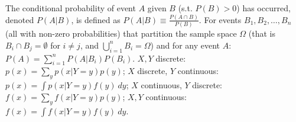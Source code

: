  The conditional probability of event $A$ given $B$ (s.t. $P(B) > 0$) has occurred, denoted $P(A|B)$, is defined as $P(A|B) \equiv \frac{P(A\cap B)}{P(B)}$.
 For events $B_1, B_2, \ldots, B_n$ (all with non-zero probabilities) that partition the sample space $\Omega$ (that is $B_i \cap B_j = \emptyset$ for $i \ne j$, and $\bigcup^{n}_{i=1}B_i = \Omega$) and for any event $A$: 
$P(A) = \sum^{n}_{i=1}P(A|B_i)P(B_i)$.
$X,Y$ discrete: $p(x) = \sum_y p(x|Y=y)p(y)$; 
$X$ discrete, $Y$ continuous: $p(x) = \int p(x|Y=y)f(y)\ dy$; 
$X$ continuous, $Y$ discrete: $f(x) = \sum_y f(x|Y=y)p(y)$; 
$X,Y$ continuous: $f(x) = \int f(x|Y=y)f(y)\ dy$.